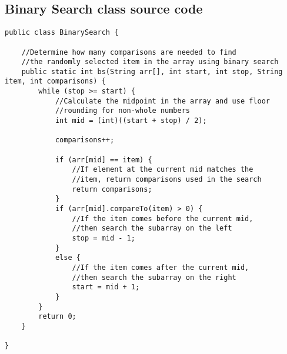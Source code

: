 \documentclass[letterpaper, 10pt,DIV=13]{scrartcl}
\numberwithin{equation}{section} %
\numberwithin{figure}{section} %
\numberwithin{table}{section} %
\begin{document}
\subsection{Binary Search class source code}
\lstset{numbers=left, numberstyle=\tiny, stepnumber=1, numbersep=5pt, basicstyle=\footnotesize\ttfamily}
\begin{lstlisting}[frame=single, ] 
public class BinarySearch {

    //Determine how many comparisons are needed to find 
    //the randomly selected item in the array using binary search
    public static int bs(String arr[], int start, int stop, String item, int comparisons) {
        while (stop >= start) {
            //Calculate the midpoint in the array and use floor
            //rounding for non-whole numbers
            int mid = (int)((start + stop) / 2);
 
            comparisons++;

            if (arr[mid] == item) {
                //If element at the current mid matches the
                //item, return comparisons used in the search
                return comparisons;
            }
            if (arr[mid].compareTo(item) > 0) {
                //If the item comes before the current mid, 
                //then search the subarray on the left
                stop = mid - 1;
            }
            else {
                //If the item comes after the current mid, 
                //then search the subarray on the right
                start = mid + 1;
            }
        }
        return 0;
    }
    
}
\end{lstlisting}
\end{document}
